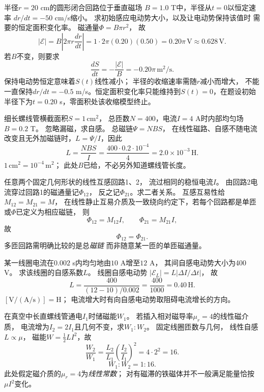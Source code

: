\problemtext 半径$r=20$ cm的圆形闭合回路位于垂直磁场
$B=1.0$ T中，半径从$t=0$以恒定速率
$dr/dt=-50$ cm/s缩小。
求初始感应电动势大小，以及让电动势保持该值时
需要的恒定面积变化率。
\workings
磁通量$\Phi=B\pi r^2$，
故
\[
|\mathcal E|=B\left|2\pi r\frac{dr}{dt}\right|
=1\cdot2\pi(0.20)(0.50)
=\boxed{0.20\pi\,\mathrm V\approx0.628\,\mathrm V}.
\]
若$B$不变，则要求
\[
\boxed{\frac{dS}{dt}=-\frac{|\mathcal E|}{B}
=-0.20\pi\,\mathrm{m^2/s}}.
\]
\crosscheck 保持电动势恒定意味着$S(t)$线性减小；
半径的收缩速率需随$r$减小而增大，
不能一直保持$dr/dt=-0.5$ m/s。恒定面积变化率只能维持到$S(t)=0$，在题设初始半径下为$t=0.20$ s，零面积处该收缩模型终止。

\problemtext 细长螺线管横截面积$S=1\,\mathrm{cm^2}$，
总匝数$N=400$，电流$I=4$ A时内部均匀场$B=0.2$ T。
忽略漏磁，求自感。
\workings
总磁链$\Psi=NB S$，
在线性磁路、自感不随电流改变且无外加磁链时，$L=\Psi/I$，因此
\[
\boxed{L=\frac{NBS}{I}
=\frac{400\cdot0.2\cdot10^{-4}}4
=2.0\times10^{-3}\,\mathrm H}.
\]
\crosscheck $1\,\mathrm{cm^2}=10^{-4}\,\mathrm{m^2}$；
此处$B$已给，不必另外知道螺线管长度。

\problemtext 任意两个固定几何形状的线性互感回路1、2，
流过相同的稳恒电流$I$。
由回路2电流穿过回路1的磁通量记$\Phi_{12}$，
反之记$\Phi_{21}$。求二者关系。
\workings
互感互易性给
$M_{12}=M_{21}=M$，
在线性静止互易介质及一致绕向约定下，若每个回路都是单匝或$\Phi$已定义为相应磁链，
则
\[
\Phi_{12}=M_{12}I,\qquad
\Phi_{21}=M_{21}I,
\]
故
\[
\boxed{\Phi_{12}=\Phi_{21}}.
\]
\crosscheck 多匝回路需明确比较的是总\emph{磁链}
而非随意某一匝的单匝磁通量。

\problemtext 某一线圈电流在$0.002$ s内均匀地由$10$ A增至$12$ A，
其间自感电动势大小为400 V。
求该线圈的自感系数$L$。
\workings
线圈自感电动势
$|\mathcal E_L|=L|\Delta I/\Delta t|$，
故
\[
\boxed{L=\frac{400}{(12-10)/0.002}
=\frac{400}{1000}=0.40\,\mathrm H}.
\]
\crosscheck $[\mathrm V/(\mathrm{A/s})]=\mathrm H$；
电流增大时有向自感电动势取阻碍电流增长的方向。

\problemtext 在真空中长直螺线管通电$I_1$时储磁能$W_1$。
若插入相对磁导率$\mu_r=4$的线性磁介质，
电流增为$I_2=2I_1$且几何不变，求$W_1:W_2$。
\workings
固定线圈匝数与几何，
线性自感$L\propto\mu$，
磁能$W=\tfrac12LI^2$，故
\[
\frac{W_2}{W_1}
=\frac{L_2}{L_1}\left(\frac{I_2}{I_1}\right)^2
=4\cdot2^2=16.
\]
\[
\boxed{W_1:W_2=1:16}.
\]
\crosscheck 此处假定磁介质的$\mu_r=4$为\emph{线性常数}；
对有磁滞的铁磁体并不一般满足能量恰按$\mu I^2$变化。

